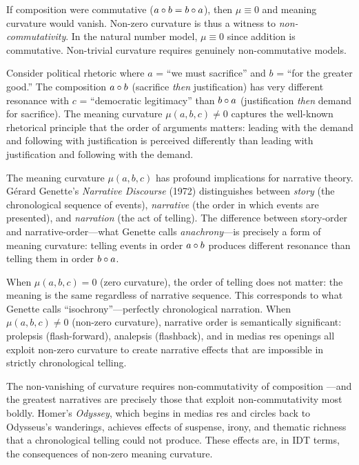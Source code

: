 \begin{remark}
If composition were commutative ($a \circ b = b \circ a$), then
$\mu \equiv 0$ and meaning curvature would vanish. Non-zero curvature
is thus a witness to \emph{non-commutativity}. In the natural number
model, $\mu \equiv 0$ since addition is commutative. Non-trivial
curvature requires genuinely non-commutative models.
\end{remark}

\begin{example}
Consider political rhetoric where $a$ = ``we must sacrifice'' and
$b$ = ``for the greater good.'' The composition $a \circ b$
(sacrifice \emph{then} justification) has very different resonance
with $c$ = ``democratic legitimacy'' than $b \circ a$ (justification
\emph{then} demand for sacrifice). The meaning curvature $\mu(a,b,c) \neq 0$
captures the well-known rhetorical principle that the order of arguments
matters: leading with the demand and following with justification is
perceived differently than leading with justification and following with
the demand.
\end{example}

\begin{remark}\label{rem:ch4:curvature_narrative}
The meaning curvature $\mu(a, b, c)$ has profound implications for
narrative theory. G\'erard Genette's \emph{Narrative Discourse} (1972)
distinguishes between \emph{story} (the chronological sequence of events),
\emph{narrative} (the order in which events are presented), and
\emph{narration} (the act of telling). The difference between story-order
and narrative-order---what Genette calls \emph{anachrony}---is precisely
a form of meaning curvature: telling events in order $a \circ b$
produces different resonance than telling them in order $b \circ a$.

When $\mu(a, b, c) = 0$ (zero curvature), the order of telling does not
matter: the meaning is the same regardless of narrative sequence. This
corresponds to what Genette calls ``isochrony''---perfectly chronological
narration. When $\mu(a, b, c) \neq 0$ (non-zero curvature), narrative
order is semantically significant: prolepsis (flash-forward), analepsis
(flashback), and in medias res openings all exploit non-zero curvature
to create narrative effects that are impossible in strictly chronological
telling.

The non-vanishing of curvature requires non-commutativity of composition
---and the greatest narratives are precisely those that exploit
non-commutativity most boldly. Homer's \emph{Odyssey}, which begins in
medias res and circles back to Odysseus's wanderings, achieves effects
of suspense, irony, and thematic richness that a chronological telling
could not produce. These effects are, in IDT terms, the consequences of
non-zero meaning curvature.
\end{remark}

